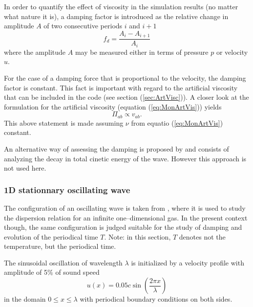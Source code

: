 \documentclass{report}
\begin{document}
In order to quantify the effect of viscosity in the simulation results (no matter what nature it is), a damping factor
is introduced as the relative change in amplitude $A$ of two consecutive periods $i$ and $i+1$
\begin{equation}
\label{eq:DampingFactor}
 f_d=\frac{A_i-A_{i+1}}{A_i}
\end{equation}
where the amplitude $A$ may be measured either in terms of pressure $p$ or velocity $u$.

For the case of a damping force that is proportional to the velocity, the damping factor
is constant. This fact is important with regard to the artificial viscosity that can be included in the code (see section (\ref{sec:ArtVisc})). A closer look at the formulation for the artificial viscosity (equation (\ref{eq:MonArtVis})) yields
\begin{equation}
 \Pi_{ab}\propto v_{ab}.
\end{equation}
This above statement is made assuming $\nu$ from equatio (\ref{eq:MonArtVis}) constant.

An alternative way of assessing the damping is proposed by \cite{Attwood2007} and consists of analyzing the decay in total cinetic energy of the wave. However this approach is not used here. 



\subsubsection{1D stationnary oscillating wave}
The configuration of an oscillating wave is taken from \cite{Monaghan2005}, where it is used
to study the dispersion relation for an infinite one--dimensional gas. In the present context though, the same configuration is judged suitable for the study of damping and evolution of the periodical time $T$.
Note: in this section, $T$ denotes not the temperature, but the periodical time. 

The sinusoidal oscillation of wavelength $\lambda$ is initialized by a velocity profile with amplitude of 5\% of sound speed
\begin{equation}
\label{eq:InitialVelocityPerturbationOscillatingWave}
 u(x)=0.05 c\sin\left(\frac{2\pi x}{\lambda}\right)
\end{equation}
in the domain $0\leq x\leq \lambda$ with periodical boundary conditions on both sides.
\end{document}
